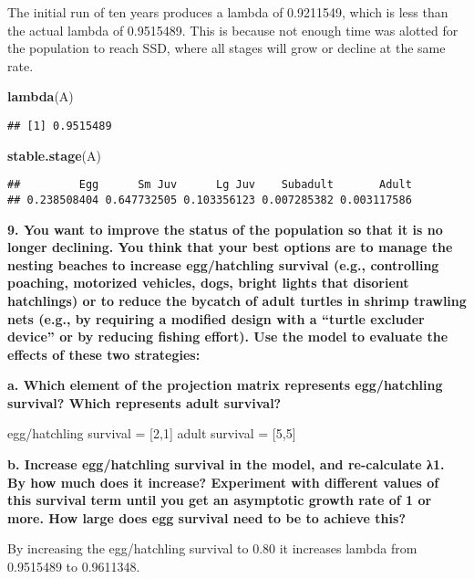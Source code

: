 \documentclass[]{article}
\newenvironment{Shaded}{\begin{snugshade}}{\end{snugshade}}
\newcommand{\KeywordTok}[1]{\textcolor[rgb]{0.13,0.29,0.53}{\textbf{#1}}}
\newcommand{\NormalTok}[1]{#1}
\begin{document}
The initial run of ten years produces a lambda of 0.9211549, which is
less than the actual lambda of 0.9515489. This is because not enough
time was alotted for the population to reach SSD, where all stages will
grow or decline at the same rate.

\begin{Shaded}
\begin{Highlighting}[]
\KeywordTok{lambda}\NormalTok{(A)}
\end{Highlighting}
\end{Shaded}

\begin{verbatim}
## [1] 0.9515489
\end{verbatim}

\begin{Shaded}
\begin{Highlighting}[]
\KeywordTok{stable.stage}\NormalTok{(A)}
\end{Highlighting}
\end{Shaded}

\begin{verbatim}
##         Egg      Sm Juv      Lg Juv    Subadult       Adult 
## 0.238508404 0.647732505 0.103356123 0.007285382 0.003117586
\end{verbatim}

\textbf{9. You want to improve the status of the population so that it
is no longer declining. You think that your best options are to manage
the nesting beaches to increase egg/hatchling survival (e.g.,
controlling poaching, motorized vehicles, dogs, bright lights that
disorient hatchlings) or to reduce the bycatch of adult turtles in
shrimp trawling nets (e.g., by requiring a modified design with a
``turtle excluder device'' or by reducing fishing effort). Use the model
to evaluate the effects of these two strategies: }

\textbf{a. Which element of the projection matrix represents
egg/hatchling survival? Which represents adult survival? }

egg/hatchling survival = {[}2,1{]} adult survival = {[}5,5{]}

\textbf{b. Increase egg/hatchling survival in the model, and
re-calculate λ1. By how much does it increase? Experiment with different
values of this survival term until you get an asymptotic growth rate of
1 or more. How large does egg survival need to be to achieve this? }

By increasing the egg/hatchling survival to 0.80 it increases lambda
from 0.9515489 to 0.9611348.
\end{document}
